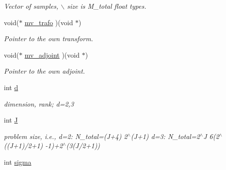 \begin{CompactItemize}
\begin{CompactList}\small\item\em Vector of samples, $\backslash$ size is M\_\-total float types. \item\end{CompactList}\item 
\hypertarget{structnsfft__plan_bbab5fc009e68a329bbebee4904e53a5}{
void($\ast$ \hyperlink{structnsfft__plan_bbab5fc009e68a329bbebee4904e53a5}{mv\_\-trafo} )(void $\ast$)}
\label{structnsfft__plan_bbab5fc009e68a329bbebee4904e53a5}

\begin{CompactList}\small\item\em Pointer to the own transform. \item\end{CompactList}\item 
\hypertarget{structnsfft__plan_9761ac166f3ec93197e8e409ba78fb4f}{
void($\ast$ \hyperlink{structnsfft__plan_9761ac166f3ec93197e8e409ba78fb4f}{mv\_\-adjoint} )(void $\ast$)}
\label{structnsfft__plan_9761ac166f3ec93197e8e409ba78fb4f}

\begin{CompactList}\small\item\em Pointer to the own adjoint. \item\end{CompactList}\item 
\hypertarget{structnsfft__plan_c5e6ad608ed1e1d39f17d1512703ddfe}{
int \hyperlink{structnsfft__plan_c5e6ad608ed1e1d39f17d1512703ddfe}{d}}
\label{structnsfft__plan_c5e6ad608ed1e1d39f17d1512703ddfe}

\begin{CompactList}\small\item\em dimension, rank; d=2,3 \item\end{CompactList}\item 
\hypertarget{structnsfft__plan_d2186982dfb4c6df290c29a47d8e3c52}{
int \hyperlink{structnsfft__plan_d2186982dfb4c6df290c29a47d8e3c52}{J}}
\label{structnsfft__plan_d2186982dfb4c6df290c29a47d8e3c52}

\begin{CompactList}\small\item\em problem size, i.e., d=2: N\_\-total=(J+4) 2$^\wedge$(J+1) d=3: N\_\-total=2$^\wedge$J 6(2$^\wedge$((J+1)/2+1) -1)+2$^\wedge$(3(J/2+1)) \item\end{CompactList}\item 
\hypertarget{structnsfft__plan_4b5a4d8e23b0309da9c51bdea4b7d954}{
int \hyperlink{structnsfft__plan_4b5a4d8e23b0309da9c51bdea4b7d954}{sigma}}
\label{structnsfft__plan_4b5a4d8e23b0309da9c51bdea4b7d954}


\end{CompactItemize}
